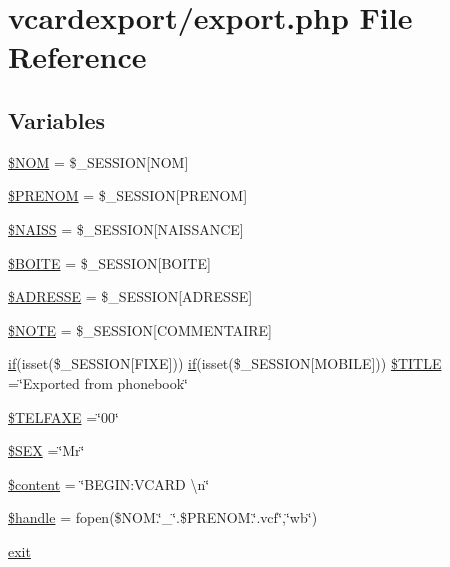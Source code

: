 \hypertarget{export_8php}{}\section{vcardexport/export.php File Reference}
\label{export_8php}
\subsection*{Variables}
\begin{DoxyCompactItemize}
\item 
\hyperlink{export_8php_a750dff64283af3d6375db5ce36e95415}{\$\+N\+OM} = \$\+\_\+\+S\+E\+S\+S\+I\+ON\mbox{[}\textquotesingle{}N\+OM\textquotesingle{}\mbox{]}
\item 
\hyperlink{export_8php_a62bf681e7d61f825b828da40a6b1bf2c}{\$\+P\+R\+E\+N\+OM} = \$\+\_\+\+S\+E\+S\+S\+I\+ON\mbox{[}\textquotesingle{}P\+R\+E\+N\+OM\textquotesingle{}\mbox{]}
\item 
\hyperlink{export_8php_a3aa1024e42203ebc746e3a4601feff73}{\$\+N\+A\+I\+SS} = \$\+\_\+\+S\+E\+S\+S\+I\+ON\mbox{[}\textquotesingle{}N\+A\+I\+S\+S\+A\+N\+CE\textquotesingle{}\mbox{]}
\item 
\hyperlink{export_8php_a815755e7eec61ff67dc4e78e915bd8b1}{\$\+B\+O\+I\+TE} = \$\+\_\+\+S\+E\+S\+S\+I\+ON\mbox{[}\textquotesingle{}B\+O\+I\+TE\textquotesingle{}\mbox{]}
\item 
\hyperlink{export_8php_a3389039aee5ceba349e63b02ed7e5334}{\$\+A\+D\+R\+E\+S\+SE} = \$\+\_\+\+S\+E\+S\+S\+I\+ON\mbox{[}\textquotesingle{}A\+D\+R\+E\+S\+SE\textquotesingle{}\mbox{]}
\item 
\hyperlink{export_8php_ae9e9ba4906ebc8137aa03dee384269ba}{\$\+N\+O\+TE} = \$\+\_\+\+S\+E\+S\+S\+I\+ON\mbox{[}\textquotesingle{}C\+O\+M\+M\+E\+N\+T\+A\+I\+RE\textquotesingle{}\mbox{]}
\item 
\hyperlink{controleur_create_phone_8php_ae87c4f53487f23ee9a965a6691be21d2}{if}(isset(\$\+\_\+\+S\+E\+S\+S\+I\+ON\mbox{[}\textquotesingle{}F\+I\+XE\textquotesingle{}\mbox{]})) \hyperlink{controleur_create_phone_8php_ae87c4f53487f23ee9a965a6691be21d2}{if}(isset(\$\+\_\+\+S\+E\+S\+S\+I\+ON\mbox{[}\textquotesingle{}M\+O\+B\+I\+LE\textquotesingle{}\mbox{]})) \hyperlink{export_8php_a6cb57318f50912e566bc4dd02a31e520}{\$\+T\+I\+T\+LE} =\char`\"{}Exported from phonebook\char`\"{}
\item 
\hyperlink{export_8php_a7f8dbaea5af01cafd149289978e469fa}{\$\+T\+E\+L\+F\+A\+XE} =\char`\"{}00\char`\"{}
\item 
\hyperlink{export_8php_aa48d51306cf2d19c7dd3ca22bd7a734a}{\$\+S\+EX} =\char`\"{}Mr\char`\"{}
\item 
\hyperlink{export_8php_a57b284fe00866494b33afa80ba729bed}{\$content} = \char`\"{}B\+E\+G\+I\+N\+:\+V\+C\+A\+RD \textbackslash{}n\char`\"{}
\item 
\hyperlink{export_8php_ad86c3fbc5672e1deeafc5229012b0b5d}{\$handle} = fopen(\$N\+O\+M.\char`\"{}\+\_\+\char`\"{}.\$P\+R\+E\+N\+O\+M.\char`\"{}.vcf\char`\"{},\char`\"{}wb\char`\"{})
\item 
\hyperlink{export_8php_a6733eb5f605d09eaede9845835d71c4e}{exit}
\end{DoxyCompactItemize}


